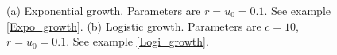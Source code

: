 \begin{figure}[!!!h!!!tb]
{\centering
{}
\caption{(a) Exponential growth. Parameters are $r=u_0=0.1$. See example \ref{Expo_growth}. (b) Logistic growth. Parameters are $c=10$, $r=u_0=0.1$. See example \ref{Logi_growth}.}\label{Growth_examples}}
\end{figure}


